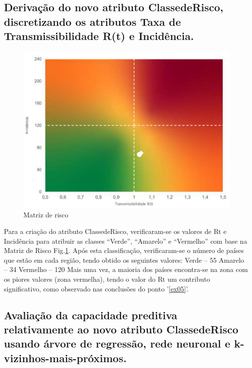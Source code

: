 \documentclass[conference]{IEEEtran}
\begin{document}
\subsection{Derivação do novo atributo ClassedeRisco, discretizando os atributos Taxa de Transmissibilidade R(t) e Incidência.}
\begin{figure}[htbp]
\centerline{\includegraphics[width=0.95\columnwidth]{images/matrix.png}}
\caption{Matriz de risco}
\label{matrix}
\end{figure}
Para a criação do atributo ClassedeRisco, verificaram-se os valores de Rt e Incidência para atribuir as classes “Verde”, “Amarelo” e “Vermelho” com base na Matriz de Risco Fig.\ref{matrix}.
Após esta classificação, verificaram-se o número de países que estão em cada região, tendo obtido os seguintes valores:
Verde – 55
Amarelo – 34
Vermelho – 120
Mais uma vez, a maioria dos países encontra-se na zona com os piores valores (zona vermelha), tendo o valor do Rt um contributo significativo, como observado nas conclusões do ponto '\ref{ex05}'.



\subsection{Avaliação da capacidade preditiva relativamente ao novo atributo ClassedeRisco usando árvore de regressão, rede neuronal e k-vizinhos-mais-próximos.}
\end{document}
